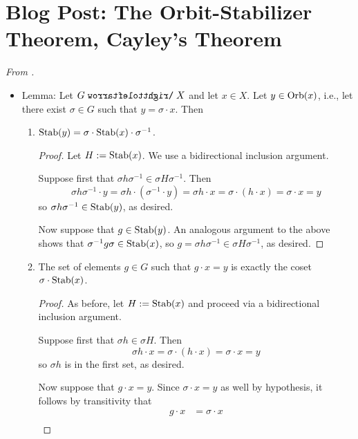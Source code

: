 \documentclass[../notes.tex]{subfiles}
\begin{document}
\section{Blog Post: The Orbit-Stabilizer Theorem, Cayley's Theorem}
\emph{From \textcite{bib:Calegari}.}
\begin{itemize}
    \item {}Lemma: Let $G\acts X$ and let $x\in X$. Let $y\in\operatorname{Orb}(x)$, i.e., let there exist $\sigma\in G$ such that $y=\sigma\cdot x$. Then
    \begin{enumerate}
        \item $\operatorname{Stab}(y)=\sigma\cdot\operatorname{Stab}(x)\cdot\sigma^{-1}$.
        \begin{proof}
            Let $H:=\operatorname{Stab}(x)$. We use a bidirectional inclusion argument.\par
            Suppose first that $\sigma h\sigma^{-1}\in\sigma H\sigma^{-1}$. Then
            \begin{equation*}
                \sigma h\sigma^{-1}\cdot y = \sigma h\cdot(\sigma^{-1}\cdot y)
                = \sigma h\cdot x
                = \sigma\cdot(h\cdot x)
                = \sigma\cdot x
                = y
            \end{equation*}
            so $\sigma h\sigma^{-1}\in\operatorname{Stab}(y)$, as desired.\par
            Now suppose that $g\in\operatorname{Stab}(y)$. An analogous argument to the above shows that $\sigma^{-1}g\sigma\in\operatorname{Stab}(x)$, so $g=\sigma h\sigma^{-1}\in\sigma H\sigma^{-1}$, as desired.
        \end{proof}
        \item The set of elements $g\in G$ such that $g\cdot x=y$ is exactly the coset $\sigma\cdot\operatorname{Stab}(x)$.
        \begin{proof}
            As before, let $H:=\operatorname{Stab}(x)$ and proceed via a bidirectional inclusion argument.\par
            Suppose first that $\sigma h\in\sigma H$. Then
            \begin{equation*}
                \sigma h\cdot x = \sigma\cdot(h\cdot x)
                = \sigma\cdot x
                = y
            \end{equation*}
            so $\sigma h$ is in the first set, as desired.\par
            Now suppose that $g\cdot x=y$. Since $\sigma\cdot x=y$ as well by hypothesis, it follows by transitivity that
            \begin{align*}
                g\cdot x &= \sigma\cdot x\\

\end{align*}
\end{proof}
\end{enumerate}
\end{itemize}
\end{document}
